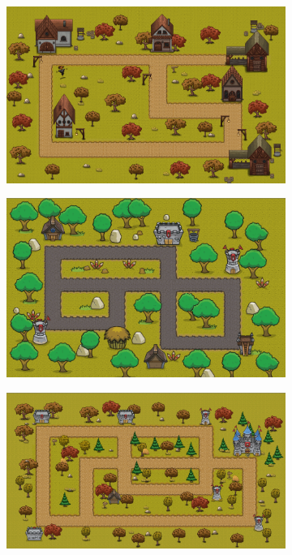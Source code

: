 \documentclass[10pt, conference, compsocconf]{IEEEtran}
\begin{document}
\begin{figure}[ht]
	\centering
	\begin{subfigure}[b]{0.30\textwidth}
		\includegraphics[width=\textwidth]{Figuras/faseTutorial.png}
		\caption{}
		\label{faseTutorial}
	\end{subfigure}
	
	\begin{subfigure}[b]{0.30\textwidth}
		\includegraphics[width=\textwidth]{Figuras/fase2.png}
		\caption{}
		\label{fase2}
	\end{subfigure}

	\begin{subfigure}[b]{0.30\textwidth}
		\includegraphics[width=\textwidth]{Figuras/fase3.png}
		\caption{}
		\label{faseFinal}
	\end{subfigure}


\end{figure}
\end{document}
